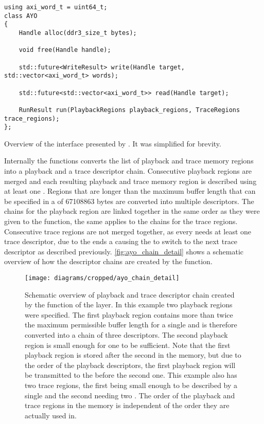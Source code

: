 \begin{listing}
\begin{verbatim}
using axi_word_t = uint64_t;
class AYO
{
	Handle alloc(ddr3_size_t bytes);

	void free(Handle handle);

	std::future<WriteResult> write(Handle target, std::vector<axi_word_t> words);

	std::future<std::vector<axi_word_t>> read(Handle target);

	RunResult run(PlaybackRegions playback_regions, TraceRegions trace_regions);
};
\end{verbatim}
\caption{Overview of the interface presented by \ayo{}. It was simplified for brevity.}\label{listing:ayo_interface}
\end{listing}

Internally the  functions converts the list of playback and trace memory regions into a playback and a trace descriptor chain. Consecutive playback regions are merged and each resulting playback and trace memory region is described using at least one \descriptor{}. Regions that are longer than the maximum buffer length that can be specified in a \descriptor{} of \num{67108863} bytes are converted into multiple descriptors. The \descriptor{} chains for the playback region are linked together in the same order as they were given to the  function, the same applies to the \descriptor{} chains for the trace regions. Consecutive trace regions are not merged together, as every \PlaybackProgram{} needs at least one trace descriptor, due to the \haltInstr{} ends a \PlaybackProgram{} causing the \AXIDMA{} to switch to the next trace descriptor as described previously.
\autoref{fig:ayo_chain_detail} shows a schematic overview of how the descriptor chains are created by the  function.

\begin{figure}[htbp]
\centerline{\texttt{[image: diagrams/cropped/ayo\_chain\_detail]}}
\caption{Schematic overview of playback and trace descriptor chain created by the  function of the \ayo{} layer. In this example two playback regions were specified. The first playback region contains more than twice the maximum permissible buffer length for a single \descriptor{} and is therefore converted into a chain of three descriptors. The second playback region is small enough for one \descriptor{} to be sufficient. Note that the first playback region is stored after the second in the memory, but due to the order of the playback descriptors, the first playback region will be transmitted to the \pbexec{} before the second one. This example also has two trace regions, the first being small enough to be described by a single \descriptor{} and the second needing two \descriptor{}. The order of the playback and trace regions in the \DDR{} memory is independent of the order they are actually used in.}\label{fig:ayo_chain_detail}
\end{figure}

